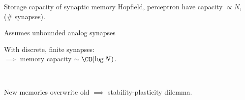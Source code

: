 \documentclass{beamer}%
\begin{document}
\begin{frame}{Storage capacity of synaptic memory}
%
  Hopfield, perceptron have capacity $\propto N$, (\# synapses).

\vp\parbox[t]{0.59\linewidth}{%
  Assumes unbounded analog synapses

 \vp With discrete, finite synapses:\\
 $\implies$ memory capacity  $\sim\CO(\log N)$.
 \\ 
 }
 \parbox[t]{0.4\linewidth}{
    \hfill{}
 }
 \\


 \vp New memories overwrite old
 $\implies$ stability-plasticity dilemma.
%
\end{frame}


\end{document}
